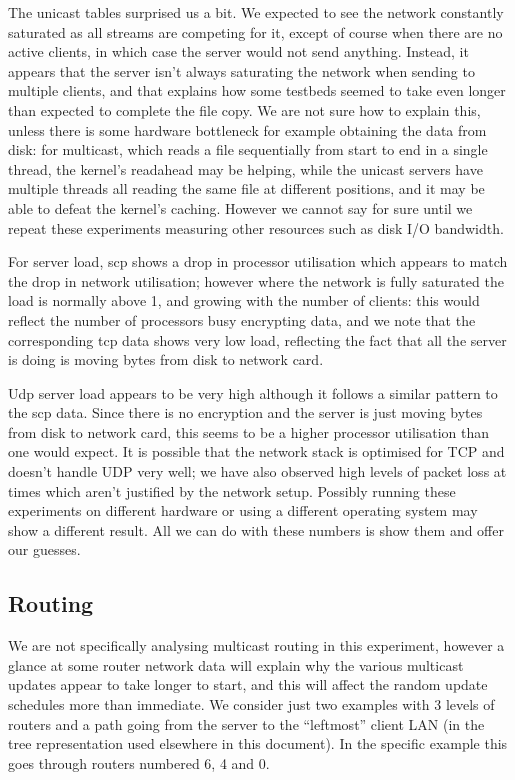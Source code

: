 \documentclass[a4paper,11pt,twocolumn]{article}
\begin{document}
The unicast tables surprised us a bit.  We expected to see the network
constantly saturated as all streams are competing for it, except of course
when there are no active clients, in which case the server would not send
anything.  Instead, it appears that the server isn't always saturating
the network when sending to multiple clients, and that explains how
some testbeds seemed to take even longer than expected to complete the
file copy.  We are not sure how to explain this, unless there is some
hardware bottleneck for example obtaining the data from disk: for
multicast, which reads a file sequentially from start to end in a
single thread, the kernel's readahead may be helping, while the
unicast servers have multiple threads all reading the same file at
different positions, and it may be able to defeat the kernel's
caching.  However we cannot say for sure until we repeat these
experiments measuring other resources such as disk I/O bandwidth.

For server load, scp shows a drop in processor utilisation which appears
to match the drop in network utilisation; however where the network is
fully saturated the load is normally above 1, and growing with the
number of clients: this would reflect the number of processors busy
encrypting data, and we note that the corresponding tcp data shows very
low load, reflecting the fact that all the server is doing is moving
bytes from disk to network card.

Udp server load appears to be very high although it follows a similar
pattern to the scp data. Since there is no encryption and the server
is just moving bytes from disk to network card, this seems to be
a higher processor utilisation than one would expect. It is possible
that the network stack is optimised for TCP and doesn't handle UDP
very well; we have also observed high levels of packet loss at times
which aren't justified by the network setup.  Possibly running these
experiments on different hardware or using a different operating
system may show a different result.  All we can do with these numbers
is show them and offer our guesses.

\subsection{Routing}

We are not specifically analysing multicast routing in this experiment,
however a glance at some router network data will explain why the various
multicast updates appear to take longer to start, and this will affect
the random update schedules more than immediate.  We consider just
two examples with 3 levels of routers and a path going from the server
to the ``leftmost'' client LAN (in the tree representation used elsewhere
in this document). In the specific example this goes through routers
numbered 6, 4 and 0.
\end{document}
